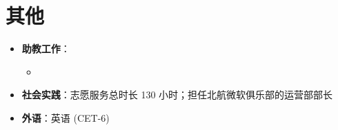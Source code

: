 \documentclass{resume}
\begin{document}

\section{其他}
\begin{itemize}
  \item \textbf{助教工作}：
        \begin{itemize}
          \item {}
        \end{itemize}
  \item \textbf{社会实践}：志愿服务总时长 130 小时；担任北航微软俱乐部的运营部部长
  \item \textbf{外语}：英语 (CET-6)
\end{itemize}
\end{document}
